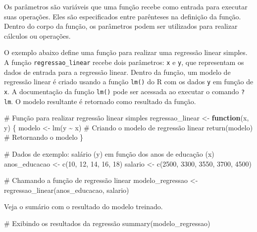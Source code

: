 \documentclass[
  portuguese,
  letterpaper,
  DIV=11,
  numbers=noendperiod]{scrreprt}
\newenvironment{Shaded}{\begin{snugshade}}{\end{snugshade}}
\newcommand{\CommentTok}[1]{\textcolor[rgb]{0.37,0.37,0.37}{#1}}
\newcommand{\ControlFlowTok}[1]{\textcolor[rgb]{0.00,0.23,0.31}{\textbf{#1}}}
\newcommand{\DecValTok}[1]{\textcolor[rgb]{0.68,0.00,0.00}{#1}}
\newcommand{\FunctionTok}[1]{\textcolor[rgb]{0.28,0.35,0.67}{#1}}
\newcommand{\NormalTok}[1]{\textcolor[rgb]{0.00,0.23,0.31}{#1}}
\newcommand{\OtherTok}[1]{\textcolor[rgb]{0.00,0.23,0.31}{#1}}
\newcommand{\SpecialCharTok}[1]{\textcolor[rgb]{0.37,0.37,0.37}{#1}}
\theoremstyle{definition}
\theoremstyle{remark}
\begin{document}
Os parâmetros são variáveis que uma função recebe como entrada para
executar suas operações. Eles são especificados entre parênteses na
definição da função. Dentro do corpo da função, os parâmetros podem ser
utilizados para realizar cálculos ou operações.

O exemplo abaixo define uma função para realizar uma regressão linear
simples. A função \texttt{regressao\_linear} recebe dois parâmetros:
\texttt{x} e \texttt{y}, que representam os dados de entrada para a
regressão linear. Dentro da função, um modelo de regressão linear é
criado usando a função \texttt{lm()} do R com os dados \texttt{y} em
função de \texttt{x}. A documentação da função \texttt{lm()} pode ser
acessada ao executar o comando \texttt{?lm}. O modelo resultante é
retornado como resultado da função.

\begin{Shaded}
\begin{Highlighting}[]
\CommentTok{\# Função para realizar regressão linear simples}
\NormalTok{regressao\_linear }\OtherTok{\textless{}{-}} \ControlFlowTok{function}\NormalTok{(x, y) \{}
\NormalTok{  modelo }\OtherTok{\textless{}{-}} \FunctionTok{lm}\NormalTok{(y }\SpecialCharTok{\textasciitilde{}}\NormalTok{ x)  }\CommentTok{\# Criando o modelo de regressão linear}
  \FunctionTok{return}\NormalTok{(modelo)  }\CommentTok{\# Retornando o modelo}
\NormalTok{\}}

\CommentTok{\# Dados de exemplo: salário (y) em função dos anos de educação (x)}
\NormalTok{anos\_educacao }\OtherTok{\textless{}{-}} \FunctionTok{c}\NormalTok{(}\DecValTok{10}\NormalTok{, }\DecValTok{12}\NormalTok{, }\DecValTok{14}\NormalTok{, }\DecValTok{16}\NormalTok{, }\DecValTok{18}\NormalTok{)}
\NormalTok{salario }\OtherTok{\textless{}{-}} \FunctionTok{c}\NormalTok{(}\DecValTok{2500}\NormalTok{, }\DecValTok{3300}\NormalTok{, }\DecValTok{3550}\NormalTok{, }\DecValTok{3700}\NormalTok{, }\DecValTok{4500}\NormalTok{)}

\CommentTok{\# Chamando a função de regressão linear}
\NormalTok{modelo\_regressao }\OtherTok{\textless{}{-}} \FunctionTok{regressao\_linear}\NormalTok{(anos\_educacao, salario)}
\end{Highlighting}
\end{Shaded}

Veja o sumário com o resultado do modelo treinado.

\begin{Shaded}
\begin{Highlighting}[]
\CommentTok{\# Exibindo os resultados da regressão}
\FunctionTok{summary}\NormalTok{(modelo\_regressao)}
\end{Highlighting}
\end{Shaded}
\end{document}
